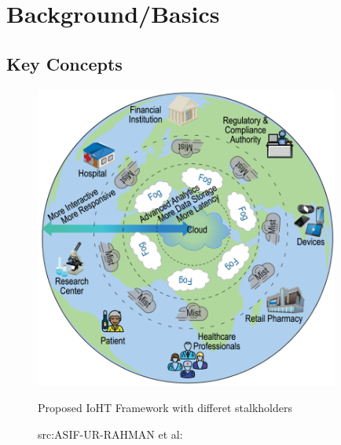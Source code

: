 \section{Background/Basics}\label{sec:two}
\subsection{Key Concepts}
\begin{figure}[H]
	\centering
	\includegraphics[width=10cm]{image/Fogcloudmist.png}
	\caption{Proposed IoHT Framework with differet stalkholders}
	\caption*{src:ASIF-UR-RAHMAN et al:\cite{3}}
\end{figure}
